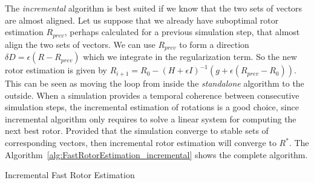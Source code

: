 \documentclass{birkjour}
\numberwithin{equation}{section}
\begin{document}
The \emph{incremental} algorithm is best suited if we know that the two sets of vectors are almost aligned. Let us suppose that we already have suboptimal rotor estimation $R_{prev}$, perhaps calculated for a previous simulation step, that almost align the two sets of vectors. We can use $R_{prev}$ to form a direction $\delta D = \epsilon (R - R_{prev})$ which we integrate in the regularization term. So the new rotor estimation is given by $R_{i+1} = R_0 - (H + \epsilon I)^{-1} (g + \epsilon (R_{prev} - R_0))$. This can be seen as moving the loop from inside the \emph{standalone} algorithm to the outside. When a simulation provides a temporal coherence between consecutive simulation steps, the incremental estimation of rotations is a good choice, since incremental algorithm only requires to solve a linear system for computing the next best rotor. Provided that the simulation converge to stable sets of corresponding vectors, then incremental rotor estimation will converge to $R^*$. The Algorithm~\ref{alg:FastRotorEstimation_incremental} shows the complete algorithm.

\begin{algorithm}
\begin{algorithmic}[1]
\ENDFOR
{} 
\end{algorithmic}
\caption{Incremental Fast Rotor Estimation}\label{alg:FastRotorEstimation_incremental}
\end{algorithm}
\end{document}
